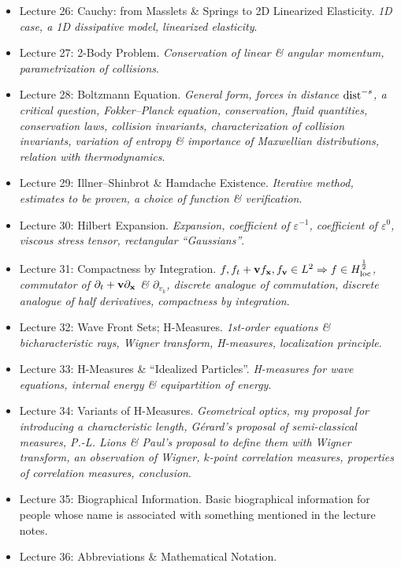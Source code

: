 \documentclass{article}
\begin{document}
\begin{enumerate}
\begin{itemize}
		\item {\sf Lecture 26: Cauchy: from Masslets \& Springs to 2D Linearized Elasticity.} {\it1D case, a 1D dissipative model, linearized elasticity}.
		
		\item {\sf Lecture 27: 2-Body Problem.} {\it Conservation of linear \& angular momentum, parametrization of collisions}.
		
		\item {\sf Lecture 28: Boltzmann Equation.} {\it General form, forces in {\it distance} ${\rm dist}^{-s}$, a critical question, Fokker--Planck equation, conservation, fluid quantities, conservation laws, collision invariants, characterization of collision invariants, variation of entropy \& importance of Maxwellian distributions, relation with thermodynamics}.
		
		\item {\sf Lecture 29: Illner--Shinbrot \& Hamdache Existence.} {\it Iterative method, estimates to be proven, a choice of function \& verification}.
		
		\item {\sf Lecture 30: Hilbert Expansion.} {\it Expansion, coefficient of $\varepsilon^{-1}$, coefficient of $\varepsilon^0$, viscous stress tensor, rectangular ``Gaussians''}.
		
		\item {\sf Lecture 31: Compactness by Integration.} {\it$f,f_t + {\bf v}f_{\bf x},f_{\bf v}\in L^2\Rightarrow f\in H_{\rm loc}^{\frac{1}{2}}$, commutator of $\partial_t + {\bf v}\partial_{\bf x}$ \& $\partial_{v_k}$, discrete analogue of commutation, discrete analogue of half derivatives, compactness by integration}.
		
		\item {\sf Lecture 32: Wave Front Sets; H-Measures.} {\it1st-order equations \& bicharacteristic rays, Wigner transform, H-measures, localization principle}.
		
		\item {\sf Lecture 33: H-Measures \& ``Idealized Particles''.} {\it H-measures for wave equations, internal energy \& equipartition of energy}.
		
		\item {\sf Lecture 34: Variants of H-Measures.} {\it Geometrical optics, my proposal for introducing a characteristic length, {\sc G\'erard}'s proposal of semi-classical measures, {\sc P.-L. Lions \& Paul}'s proposal to define them with Wigner transform, an observation of {\sc Wigner}, $k$-point correlation measures, properties of correlation measures, conclusion}.
		
		\item {\sf Lecture 35: Biographical Information.} Basic biographical information for people whose name is associated with something mentioned in the lecture notes.
		\item {\sf Lecture 36: Abbreviations \& Mathematical Notation.}
	\end{itemize}
\end{enumerate}
\end{document}

